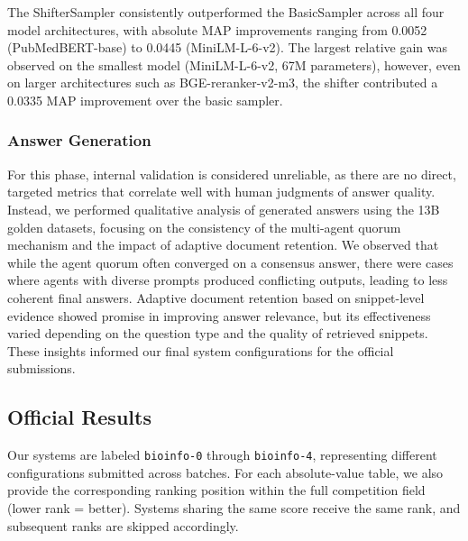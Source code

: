 The ShifterSampler consistently outperformed the BasicSampler across all four model architectures, with absolute MAP improvements ranging from 0.0052 (PubMedBERT-base) to 0.0445 (MiniLM-L-6-v2). The largest relative gain was observed on the smallest model (MiniLM-L-6-v2, 67M parameters), however, even on larger architectures such as BGE-reranker-v2-m3, the shifter contributed a 0.0335 MAP improvement over the basic sampler.

\subsubsection{Answer Generation}

For this phase, internal validation is considered unreliable, as there are no direct, targeted metrics that correlate well with human judgments of answer quality. Instead, we performed qualitative analysis of generated answers using the 13B golden datasets, focusing on the consistency of the multi-agent quorum mechanism and the impact of adaptive document retention. We observed that while the agent quorum often converged on a consensus answer, there were cases where agents with diverse prompts produced conflicting outputs, leading to less coherent final answers. Adaptive document retention based on snippet-level evidence showed promise in improving answer relevance, but its effectiveness varied depending on the question type and the quality of retrieved snippets. These insights informed our final system configurations for the official submissions.

\subsection{Official Results}
Our systems are labeled \texttt{bioinfo-0} through \texttt{bioinfo-4}, representing different configurations submitted across batches. For each absolute-value table, we also provide the corresponding ranking position within the full competition field (lower rank = better). Systems sharing the same score receive the same rank, and subsequent ranks are skipped accordingly.

